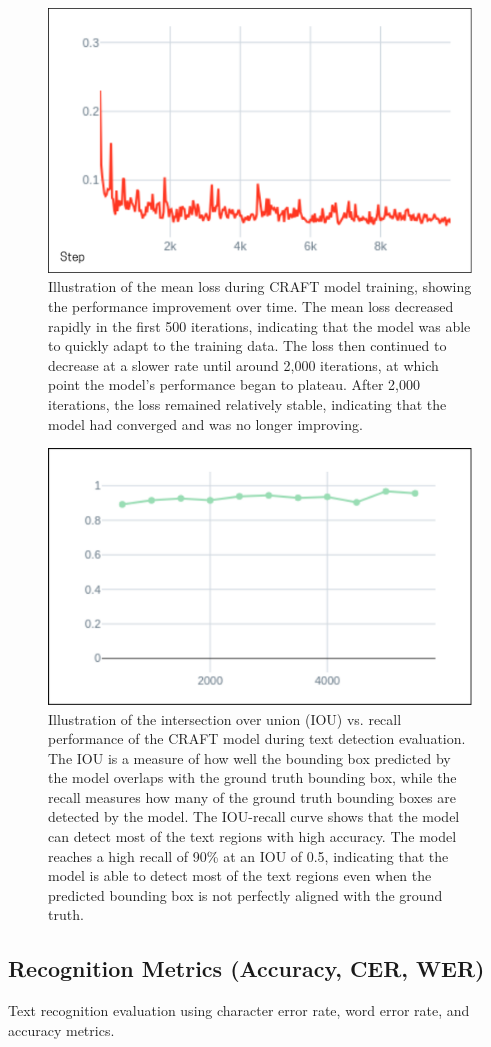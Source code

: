 \begin{figure}[ht]
    \centering
    \includegraphics[width=\textwidth]{figures/mean_loss_craft.png}
    \caption{Illustration of the mean loss during CRAFT model training, showing the performance 
    improvement over time. The mean loss decreased rapidly in the first 500 iterations, 
    indicating that the model was able to quickly adapt to the training data. The loss then 
    continued to decrease at a slower rate until around 2,000 iterations, at which point 
    the model's performance began to plateau. After 2,000 iterations, the loss remained 
    relatively stable, indicating that the model had converged and was no longer improving.}
    \label{fig:mean-loss-craft}
\end{figure}

\begin{figure}[ht]
    \centering
    \includegraphics[width=\textwidth]{figures/iou_craft.png}
    \caption{Illustration of the intersection over union (IOU) vs. recall performance of the CRAFT model 
    during text detection evaluation. The IOU is a measure of how well the bounding box predicted 
    by the model overlaps with the ground truth bounding box, while the recall measures how many of 
    the ground truth bounding boxes are detected by the model. The IOU-recall curve shows that the 
    model can detect most of the text regions with high accuracy. The model reaches a high recall of 
    90\% at an IOU of 0.5, indicating that the model is able to detect most of the text regions even 
    when the predicted bounding box is not perfectly aligned with the ground truth.}
    \label{fig:iou-recall-craft}
\end{figure}


\subsection{Recognition Metrics (Accuracy, CER, WER)}
\label{subsec:recognition-metrics}
Text recognition evaluation using character error rate, word error rate, and accuracy metrics.
